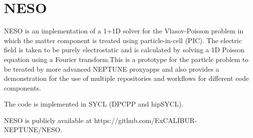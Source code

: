 \section{NESO}

NESO is an implementation of a 1+1D solver for the Vlasov-Poisson problem in which the matter component is 
treated using particle-in-cell (PIC).  The electric field is taken to be purely electrostatic and is calculated by 
solving a 1D Poisson equation using a Fourier transform.This is a prototype for the particle problem to be treated by
 more advanced NEPTUNE proxyapps and also provides a demonstration for the use of multiple repositories and workflows
 for different code components.  

The code is implemented in SYCL (DPCPP and hipSYCL).

NESO is publicly available at {https://github.com/ExCALIBUR-NEPTUNE/NESO}. 

